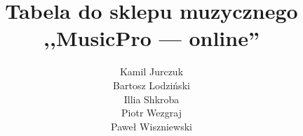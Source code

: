 \documentclass[a4page]{article}
\begin{document}
	\begin{titlepage}
		\title{Tabela do sklepu muzycznego ,,MusicPro --- online''\\}
		\author{Kamil Jurczuk \\ Bartosz Lodziński \\ Illia Shkroba \\ Piotr Wezgraj \\Paweł Wiszniewski}
		\makeatletter
			\centering
			{
				{\Huge{\@title}}
				\vspace{5cm}
				{\LARGE{\@author}}
			}
		\makeatother

	\end{titlepage}

	\begin{table}
	\newcommand\next{\stepcounter{rownumber}\arabic{rownumber}}
		\begin{adjustwidth}{-3cm}{}
			\begin{tabular}{|c|c|c|c|}
			

\end{tabular}
\end{adjustwidth}
\end{table}
\end{document}
